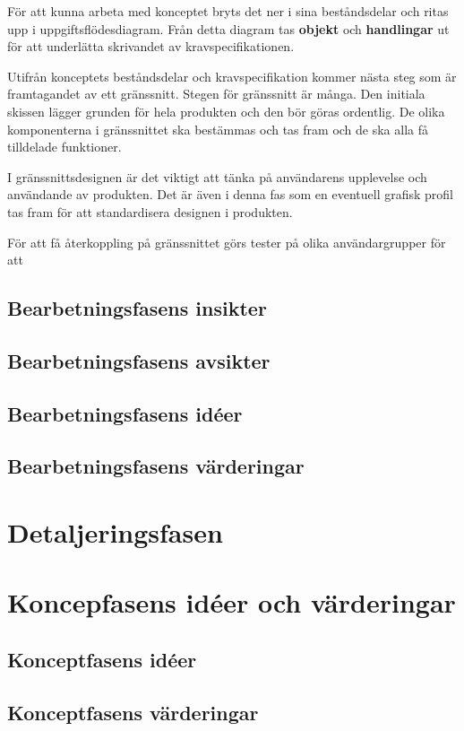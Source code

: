 \documentclass[12pt,a4paper]{article}
\begin{document}
För att kunna arbeta med konceptet bryts det ner i sina beståndsdelar och ritas upp i uppgiftsflödesdiagram. Från detta diagram tas \textbf{objekt} och \textbf{handlingar} ut för att underlätta skrivandet av kravspecifikationen.

Utifrån konceptets beståndsdelar och kravspecifikation kommer nästa steg som är framtagandet av ett gränssnitt. Stegen för gränssnitt är många. Den initiala skissen lägger grunden för hela produkten och den bör göras ordentlig. De olika komponenterna i gränssnittet ska bestämmas och tas fram och de ska alla få tilldelade funktioner.

I gränssnittsdesignen är det viktigt att tänka på användarens upplevelse och användande av produkten. Det är även i denna fas som en eventuell grafisk profil tas fram för att standardisera designen i produkten. 

För att få återkoppling på gränssnittet görs tester på olika användargrupper för att 

\subsection{Bearbetningsfasens insikter}
\subsection{Bearbetningsfasens avsikter}
\subsection{Bearbetningsfasens idéer}
\subsection{Bearbetningsfasens värderingar}

\section{Detaljeringsfasen}

\iffalse

\section{Koncepfasens idéer och värderingar}
\subsection{Konceptfasens idéer}
\subsection{Konceptfasens värderingar}
\end{document}
